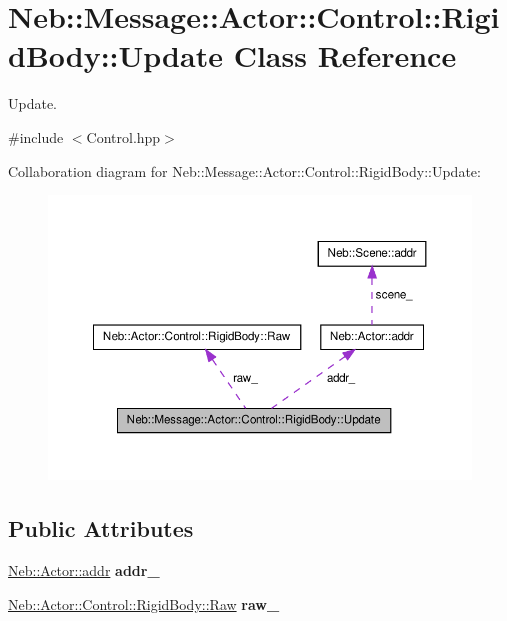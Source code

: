 \hypertarget{classNeb_1_1Message_1_1Actor_1_1Control_1_1RigidBody_1_1Update}{\section{\-Neb\-:\-:\-Message\-:\-:\-Actor\-:\-:\-Control\-:\-:\-Rigid\-Body\-:\-:\-Update \-Class \-Reference}
\label{classNeb_1_1Message_1_1Actor_1_1Control_1_1RigidBody_1_1Update}
}


\-Update.  




{\ttfamily \#include $<$\-Control.\-hpp$>$}



\-Collaboration diagram for \-Neb\-:\-:\-Message\-:\-:\-Actor\-:\-:\-Control\-:\-:\-Rigid\-Body\-:\-:\-Update\-:\nopagebreak
\begin{figure}[H]
\begin{center}
\leavevmode
\includegraphics[width=350pt]{classNeb_1_1Message_1_1Actor_1_1Control_1_1RigidBody_1_1Update__coll__graph}
\end{center}
\end{figure}
\subsection*{\-Public \-Attributes}
\begin{DoxyCompactItemize}
\item 
\hypertarget{classNeb_1_1Message_1_1Actor_1_1Control_1_1RigidBody_1_1Update_a25b5e48e5fc308028a8c95179f0be205}{\hyperlink{classNeb_1_1Actor_1_1addr}{\-Neb\-::\-Actor\-::addr} {\bfseries addr\-\_\-}}\label{classNeb_1_1Message_1_1Actor_1_1Control_1_1RigidBody_1_1Update_a25b5e48e5fc308028a8c95179f0be205}

\item 
\hypertarget{classNeb_1_1Message_1_1Actor_1_1Control_1_1RigidBody_1_1Update_a6a5321d0c2f8d56fc8520285d7b6c5bb}{\hyperlink{classNeb_1_1Actor_1_1Control_1_1RigidBody_1_1Raw}{\-Neb\-::\-Actor\-::\-Control\-::\-Rigid\-Body\-::\-Raw} {\bfseries raw\-\_\-}}\label{classNeb_1_1Message_1_1Actor_1_1Control_1_1RigidBody_1_1Update_a6a5321d0c2f8d56fc8520285d7b6c5bb}

\end{DoxyCompactItemize}


